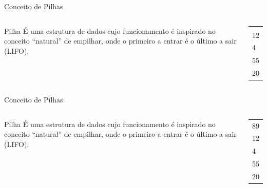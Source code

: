 \documentclass[12pt,table,xcolor={dvipsnames}]{beamer}
\begin{document}
\begin{frame}{Conceito de Pilhas}
\begin{columns}
\begin{block}{Pilha}
É uma estrutura de dados cujo funcionamento é inspirado no conceito “natural” de empilhar, onde o primeiro a entrar é o último a sair (LIFO).
\end{block}
\begin{center}
{
\begin{tabular}{ |p{.5cm}| }
\hline
 \\ \hline
 \\ \hline
12 \\ \hline
4 \\ \hline
55 \\ \hline
20  \\ \hline
\end{tabular}
}
\end{center}
\end{columns}
\end{frame}

\begin{frame}{Conceito de Pilhas}
\begin{columns}
\begin{block}{Pilha}
É uma estrutura de dados cujo funcionamento é inspirado no conceito “natural” de empilhar, onde o primeiro a entrar é o último a sair (LIFO).
\end{block}
\begin{center}
{
\begin{tabular}{ |p{.5cm}| }
\hline
 \\ \hline
89 \\ \hline
12 \\ \hline
4 \\ \hline
55 \\ \hline
20  \\ \hline
\end{tabular}
}
\end{center}
\end{columns}
\end{frame}
\end{document}

